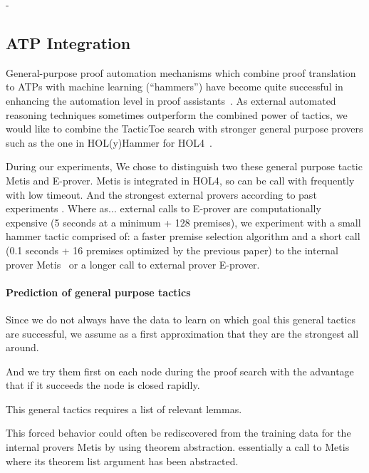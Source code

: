 \documentclass[runningheads,a4paper,draft]{svjour3}
\def\holfour{\textsf{HOL4}\xspace}
\def\eprover{\textsf{E-prover}\xspace}
\def\holyhammer{\textsf{HOL(y)Hammer}\xspace}
\def\metis{\textsf{Metis}\xspace}
\def\tactictoe{\textsf{TacticToe}\xspace}
\begin{document}
%
- 

\subsection{ATP Integration}
General-purpose proof automation mechanisms which combine proof translation to
ATPs with machine learning (``hammers'') have become quite successful in
enhancing the automation level in proof assistants~\cite{hammers4qed}.
As external automated reasoning techniques sometimes outperform the combined 
power of tactics, we would like to combine the \tactictoe search with 
stronger general purpose provers such as the one in \holyhammer for 
\holfour~\cite{tgck-cpp15}. 

During our experiments,
We chose to distinguish two these general purpose tactic \metis and \eprover.
\metis is integrated in \holfour, so can be call with frequently with low 
timeout.
And the strongest external provers according to past experiments \cite{hh4h4}.
Where as...
external calls to \eprover are computationally expensive (5 seconds at a 
minimum +  128 premises), we  
experiment with a small hammer tactic comprised of: a faster premise 
selection algorithm and
a short call (0.1 seconds + 16 premises optimized by the previous paper) to the 
internal prover \metis~\cite{metis} or a
longer call to external prover \eprover. 



\paragraph{Prediction of general purpose tactics}
Since we do not always have the data to learn on which goal this general 
tactics are successful, we assume as a first approximation that they are the 
strongest all around. 

And we try them first on each node during the proof search with the advantage 
that if it succeeds the node is closed rapidly.

This general tactics requires a list of relevant lemmas.

This forced behavior could often be rediscovered from the training data for the 
internal provers \metis by using theorem abstraction. essentially a call to 
\metis where its 
theorem list argument has been abstracted.
\end{document}
